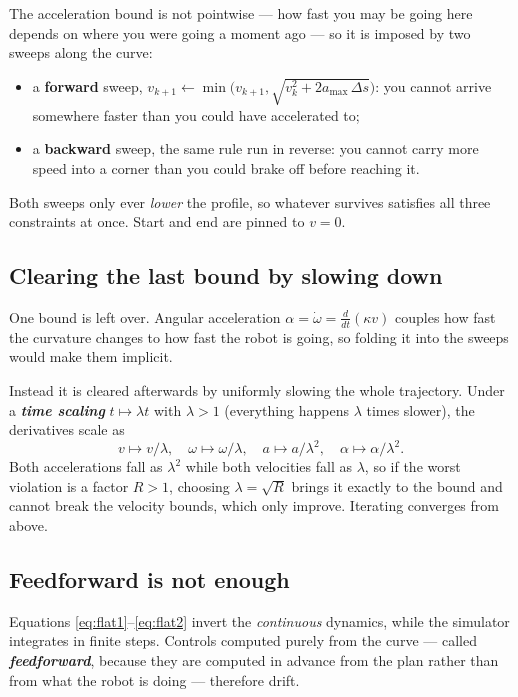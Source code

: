 \documentclass[11pt,a4paper]{article}
\newcommand{\defn}[1]{\textbf{\textit{#1}}}
\begin{document}
The acceleration bound is not pointwise --- how fast you may be going here depends on where
you were going a moment ago --- so it is imposed by two sweeps along the curve:
\begin{itemize}[nosep]
\item a \textbf{forward} sweep, $v_{k+1} \leftarrow \min\bigl(v_{k+1},
      \sqrt{v_k^2 + 2 a_{\max}\,\Delta s}\bigr)$: you cannot arrive somewhere faster than
      you could have accelerated to;
\item a \textbf{backward} sweep, the same rule run in reverse: you cannot carry more speed
      into a corner than you could brake off before reaching it.
\end{itemize}
Both sweeps only ever \emph{lower} the profile, so whatever survives satisfies all three
constraints at once. Start and end are pinned to $v = 0$.

\subsection{Clearing the last bound by slowing down}

One bound is left over. Angular acceleration
$\alpha = \dot{\omega} = \frac{d}{dt}(\kappa v)$ couples how fast the curvature changes to
how fast the robot is going, so folding it into the sweeps would make them implicit.

Instead it is cleared afterwards by uniformly slowing the whole trajectory. Under a
\defn{time scaling} $t \mapsto \lambda t$ with $\lambda > 1$ (everything happens
$\lambda$ times slower), the derivatives scale as
\[
v \mapsto v/\lambda, \quad \omega \mapsto \omega/\lambda, \quad
a \mapsto a/\lambda^2, \quad \alpha \mapsto \alpha/\lambda^2 .
\]
Both accelerations fall as $\lambda^2$ while both velocities fall as $\lambda$, so if the
worst violation is a factor $R > 1$, choosing $\lambda = \sqrt{R}$ brings it exactly to the
bound and cannot break the velocity bounds, which only improve. Iterating converges from
above.

\subsection{Feedforward is not enough}

Equations \eqref{eq:flat1}--\eqref{eq:flat2} invert the \emph{continuous} dynamics, while
the simulator integrates in finite steps. Controls computed purely from the curve --- called
\defn{feedforward}, because they are computed in advance from the plan rather than from
what the robot is doing --- therefore drift.
\end{document}
